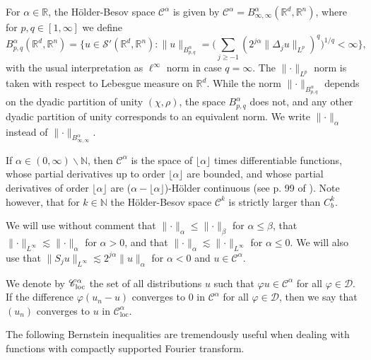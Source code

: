 \documentclass[11pt,a4paper]{article}
\newcommand{\cdummy}{\cdot}
\newcommand{\tmop}[1]{\ensuremath{\operatorname{#1}}}
\theoremstyle{remark}
\newcommand{\CC}{\ensuremath{\mathscr{C}}}
\newcommand{\CD}{\ensuremath{\mathscr{D}}}
\newcommand{\CS}{\ensuremath{\mathscr{S}}}
\begin{document}
For $\alpha \in \mathbb{R}$, the H{\"o}lder-Besov space $\CC^{\alpha}$ is given by $\CC^{\alpha} =B^{\alpha}_{\infty , \infty} (\mathbb{R}^{d},\mathbb{R}^{n} )$, where for $p,q \in [1, \infty ]$ we define
\[
   B^{\alpha}_{p,q} (\mathbb{R}^{d} ,\mathbb{R}^{n} ) = \bigg\{ u \in \CS'(\mathbb{R}^{d} ,\mathbb{R}^{n} ):\|u\|_{B^{\alpha}_{p,q}} = \bigg(\sum_{j \geqslant -1} (2^{j \alpha} \| \Delta_{j} u\|_{L^{p}} )^{q} \bigg)^{1/q} < \infty \bigg\},
\]
with the usual interpretation as $\ell^{\infty}$ norm in case $q= \infty$. The $\lVert \cdummy \rVert_{L^{p}}$ norm is taken with respect to Lebesgue measure on $\mathbb{R}^{d}$. While the norm $\lVert \cdummy \rVert_{B^{\alpha}_{p,q}}$ depends on the dyadic partition of unity $( \chi , \rho )$, the space $B^{\alpha}_{p,q}$ does not, and any other dyadic partition of unity corresponds to an equivalent norm. We write $\lVert \cdummy \rVert_{\alpha}$ instead of $\lVert \cdummy \rVert_{B^{\alpha}_{\infty , \infty}}$.

If $\alpha \in (0, \infty ) \backslash \mathbb{N}$, then $\CC^{\alpha}$ is the space of $\lfloor \alpha \rfloor$ times differentiable functions, whose partial derivatives up to order $\lfloor \alpha \rfloor$ are bounded, and whose partial derivatives of order $\lfloor \alpha \rfloor$ are ($\alpha - \lfloor \alpha \rfloor$)-H{\"o}lder continuous (see p. 99 of {\cite{Bahouri2011}}). Note however, that for $k \in \mathbb{N}$ the H{\"o}lder-Besov space $\CC^{k}$ is strictly larger than $C^{k}_{b}$.

We will use without comment that $\lVert \cdummy \rVert_{\alpha} \leqslant \lVert \cdummy \rVert_{\beta}$ for $\alpha \leqslant \beta$, that $\lVert \cdummy \rVert_{L^{\infty}} \lesssim \lVert \cdummy \rVert_{\alpha}$ for $\alpha >0$, and that $\lVert \cdummy \rVert_{\alpha} \lesssim \lVert \cdummy \rVert_{L^{\infty}}$ for $\alpha \leqslant 0$. We will also use that $\|S_{j} u\|_{L^{\infty}} \lesssim 2^{j \alpha} \|u\|_{\alpha}$ for $\alpha <0$ and $u \in \CC^{\alpha}$.

We denote by $\CC^{\alpha}_{\text{\tmop{loc}}}$ the set of all distributions $u$ such that $\varphi u \in \CC^{\alpha}$ for all $\varphi \in \CD$. If the difference $\varphi(u_n - u)$ converges to $0$ in $\CC^\alpha$ for all $\varphi \in \CD$, then we say that $(u_n)$ converges to $u$ in $\CC^\alpha_{\tmop{loc}}$.

The following Bernstein inequalities are tremendously useful when dealing with functions with compactly supported Fourier transform.
\end{document}

